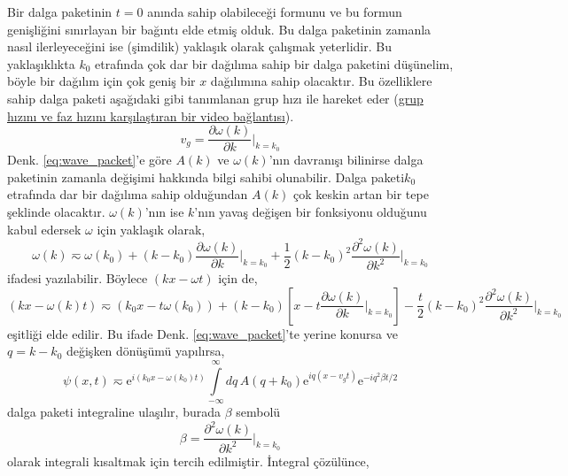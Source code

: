 \documentclass[a4paper,12pt, twoside]{article}
\begin{document}
Bir dalga paketinin $t=0$ anında sahip olabileceği formunu ve bu formun genişliğini sınırlayan bir bağıntı elde etmiş olduk. Bu dalga paketinin zamanla nasıl ilerleyeceğini ise (şimdilik) yaklaşık olarak çalışmak yeterlidir. Bu yaklaşıklıkta $k_0$ etrafında çok dar bir dağılıma sahip bir dalga paketini düşünelim, böyle bir dağılım için çok geniş bir $x$ dağılımına sahip olacaktır. Bu özelliklere sahip dalga paketi aşağıdaki gibi tanımlanan grup hızı ile hareket eder (\href{https://www.youtube.com/watch?annotation_id=annotation_1566711117&feature=iv&src_vid=MMV2Zt7x430&v=v9DPzMoWpc0
}{grup hızını ve faz hızını karşılaştıran bir video bağlantısı}).
\begin{equation}
v_g = \frac{\partial \omega(k)}{\partial k} \bigg |_{k=k_0}
\label{eq:group_velocity}
\end{equation}
Denk. \ref{eq:wave_packet}'e göre $A(k)$ ve $\omega(k)$'nın davranışı bilinirse dalga paketinin zamanla değişimi hakkında bilgi sahibi olunabilir. Dalga paketi$k_0$ etrafında dar bir dağılıma sahip olduğundan $A(k)$ çok keskin artan bir tepe şeklinde olacaktır. $\omega(k)$'nın ise $k$'nın yavaş değişen bir fonksiyonu olduğunu kabul edersek $\omega$ için yaklaşık olarak,
\begin{equation}
\omega(k) \eqsim \omega(k_0) +  (k-k_0) \frac{\partial \omega(k)}{\partial k} \bigg |_{k=k_0} + \frac{1}{2}(k-k_0)^2 \frac{\partial^2 \omega(k)}{\partial k^2} \bigg |_{k=k_0}  
\end{equation}
ifadesi yazılabilir. Böylece $(kx-\omega t)$ için de,
\begin{equation*}
(kx - \omega(k)t) \eqsim (k_0 x - t \omega(k_0)) +  (k-k_0)\left[x - t\frac{\partial \omega(k)}{\partial k} \bigg |_{k=k_0} \right] - \frac{t}{2}(k-k_0)^2 \frac{\partial^2 \omega(k)}{\partial k^2} \bigg |_{k=k_0}  
\end{equation*}
eşitliği elde edilir. Bu ifade Denk. \ref{eq:wave_packet}'te yerine konursa ve $q=k-k_0$ değişken dönüşümü yapılırsa,
\begin{equation}
\psi(x, t) \eqsim  \text{e}^{i(k_0x - \omega(k_0) t)}  \int\limits_{-\infty}^{\infty}dq\,A(q + k_0) \text{e}^{iq(x - v_g t)} \text{e}^{-iq^2\beta t/2} 
\label{eq:wave_packet_t_change}
\end{equation}
dalga paketi integraline ulaşılır, burada $\beta$ sembolü
\begin{equation*}
\beta = \frac{\partial^2 \omega(k)}{\partial k^2}\bigg |_{k=k_0}
\end{equation*}
olarak integrali kısaltmak için tercih edilmiştir. İntegral çözülünce,
\end{document}

